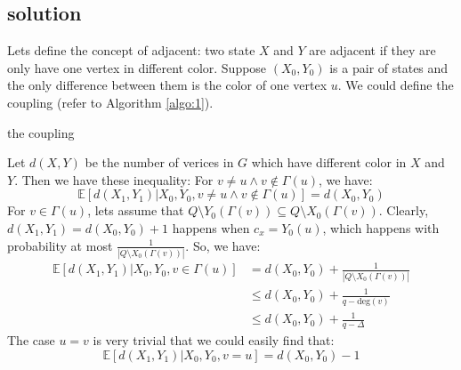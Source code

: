 \documentclass{article}
\begin{document}
\subsection{solution}
Lets define the concept of adjacent: two state $X$ and $Y$ are adjacent if they are only have one vertex in different color. Suppose $(X_0, Y_0)$ is a pair of states and the only difference between them is the color of one vertex $u$. We could define the coupling (refer to Algorithm \ref{algo:1}).
\begin{algorithm}[ht!]
  \caption{the coupling}
  \label{algo:1}
\end{algorithm}

Let $d(X, Y)$ be the number of verices in $G$ which have different color in $X$ and $Y$. Then we have these inequality:
For $v\not=u\land v\not\in\Gamma(u)$, we have:
\[
  \mathbb{E}[d(X_1, Y_1)|X_0, Y_0, v\not=u\land v\not\in\Gamma(u)] = d(X_0, Y_0) 
\]
For $v\in\Gamma(u)$, lets assume that $Q\setminus Y_0(\Gamma(v))\subseteq Q\setminus X_0(\Gamma(v))$. Clearly, $d(X_1, Y_1) = d(X_0, Y_0) + 1$ happens when $c_x = Y_0(u)$, which happens with probability at most $\frac{1}{|Q\setminus X_0(\Gamma(v))|}$. So, we have:
\begin{align*}
  \mathbb{E}[d(X_1, Y_1)|X_0, Y_0, v\in\Gamma(u)] &= d(X_0, Y_0) + \frac{1}{|Q\setminus X_0(\Gamma(v))|} \\
   &\leq d(X_0, Y_0) + \frac{1}{q - \mbox{deg}(v)} \\
   &\leq d(X_0, Y_0) + \frac{1}{q - \Delta}
\end{align*}
The case $u = v$ is very trivial that we could easily find that:
\[
  \mathbb{E}[d(X_1, Y_1)|X_0, Y_0, v = u] = d(X_0, Y_0) - 1
\]
\end{document}
